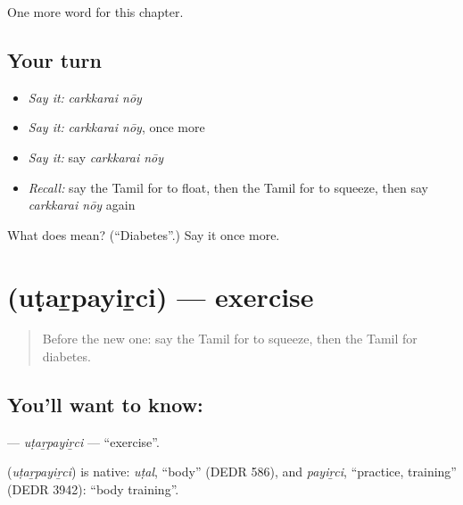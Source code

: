 \begin{grammarlens}[title={What you've built}]
One more word for this chapter.
\end{grammarlens}

\subsection*{Your turn}
\begin{itemize}
\raggedright
  \item \emph{Say it:} \emph{carkkarai nōy}
  \item \emph{Say it:} \emph{carkkarai nōy}, once more
  \item \emph{Say it:} say \emph{carkkarai nōy}
  \item \emph{Recall:} say the Tamil for to float, then the Tamil for to squeeze, then say \emph{carkkarai nōy} again
\end{itemize}

\begin{tcolorbox}[breakable,colback=teal!4,colframe=teal!35!black,title={Before you move on}]
What does   mean? (\textquotedblleft{}Diabetes\textquotedblright{}.) Say it once more.
\end{tcolorbox}
\section[\texorpdfstring{\ta{உடற்பயிற்சி} (uṭaṟpayiṟci)}{உடற்பயிற்சி (uṭaṟpayiṟci)}]{ (uṭaṟpayiṟci) — exercise}

\label{lesson:TA-C261-utarpayirci}



\begin{quote}
Before the new one: say the Tamil for to squeeze, then the Tamil for diabetes.
\end{quote}

\subsection*{You'll want to know: }
\textbf{} — \emph{uṭaṟpayiṟci} — \textquotedblleft{}exercise\textquotedblright{}.

\begin{cousinweb}
\textbf{} (\emph{uṭaṟpayiṟci}) is native: \emph{uṭal}, \textquotedblleft{}body\textquotedblright{} (DEDR 586), and \emph{payiṟci}, \textquotedblleft{}practice, training\textquotedblright{} (DEDR 3942): \textquotedblleft{}body training\textquotedblright{}.
\end{cousinweb}

